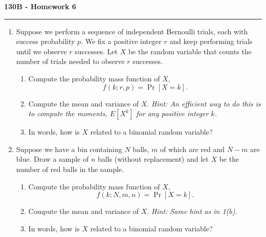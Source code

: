 \documentclass[11pt,letterpaper]{report}
\begin{document}
\begin{center}
{\bf \Large 130B - Homework 6}
\vspace{0.2cm}
\hrule
\end{center}

\begin{enumerate}
	\item Suppose we perform a sequence of independent Bernoulli trials, each with success probability $p$. We fix a positive integer $r$ and keep performing trials until we observe $r$ successes. Let $X$ be the random variable that counts the number of trials needed to observe $r$ successes.
	\begin{enumerate}
		\item Compute the probability mass function of $X$,
		\[
		f(k;r,p)= \Pr[X = k].
		\]

		\item Compute the mean and variance of $X$. \textit{Hint: An efficient way to do this is to compute the moments, $E[X^k]$ for any positive integer $k$.}

		\item In words, how is $X$ related to a binomial random variable?
	\end{enumerate}










	\item Suppose we have a bin containing $N$ balls, $m$ of which are red and $N-m$ are blue. Draw a sample of $n$ balls (without replacement) and let $X$ be the number of red balls in the sample.
	\begin{enumerate}
		\item Compute the probability mass function of $X$,
		\[
		f(k; N, m, n) = \Pr[X = k].
		\]

		\item Compute the mean and variance of $X$. \textit{Hint: Same hint as in 1(b).}

		\item In words, how is $X$ related to a binomial random variable?
	\end{enumerate}











\end{enumerate}
\end{document}
